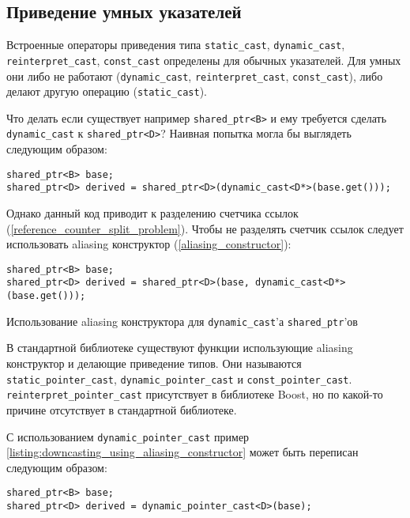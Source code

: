 \subsection{Приведение умных указателей}

Встроенные операторы приведения типа \texttt{static_cast}, \texttt{dynamic_cast}, \texttt{reinterpret_cast}, \texttt{const_cast} определены для обычных указателей. Для умных они либо не работают (\texttt{dynamic_cast}, \texttt{reinterpret_cast}, \texttt{const_cast}), либо делают другую операцию (\texttt{static_cast}).

Что делать если существует например \texttt{shared_ptr<B>} и ему требуется сделать \texttt{dynamic_cast} к \texttt{shared_ptr<D>}? Наивная попытка могла бы выглядеть следующим образом:

\begin{verbatim}
shared_ptr<B> base;
shared_ptr<D> derived = shared_ptr<D>(dynamic_cast<D*>(base.get()));
\end{verbatim}

Однако данный код приводит к разделению счетчика ссылок (\ref{reference_counter_split_problem}). Чтобы не разделять счетчик ссылок следует использовать aliasing конструктор (\ref{aliasing_constructor}):

\begin{listing}
\begin{verbatim}
shared_ptr<B> base;
shared_ptr<D> derived = shared_ptr<D>(base, dynamic_cast<D*>(base.get()));
\end{verbatim}
\caption{Использование aliasing конструктора для \texttt{dynamic_cast}'а \texttt{shared_ptr}'ов}
\label{listing:downcasting_using_aliasing_constructor}
\end{listing}

В стандартной библиотеке существуют функции использующие aliasing конструктор и делающие приведение типов. Они называются \texttt{static_pointer_cast}, \texttt{dynamic_pointer_cast} и \texttt{const_pointer_cast}. \texttt{reinterpret_pointer_cast} присутствует в библиотеке Boost, но по какой-то причине отсутствует в стандартной библиотеке.

С использованием \texttt{dynamic_pointer_cast} пример \ref{listing:downcasting_using_aliasing_constructor} может быть переписан следующим образом:
\begin{verbatim}
shared_ptr<B> base;
shared_ptr<D> derived = dynamic_pointer_cast<D>(base);
\end{verbatim}
